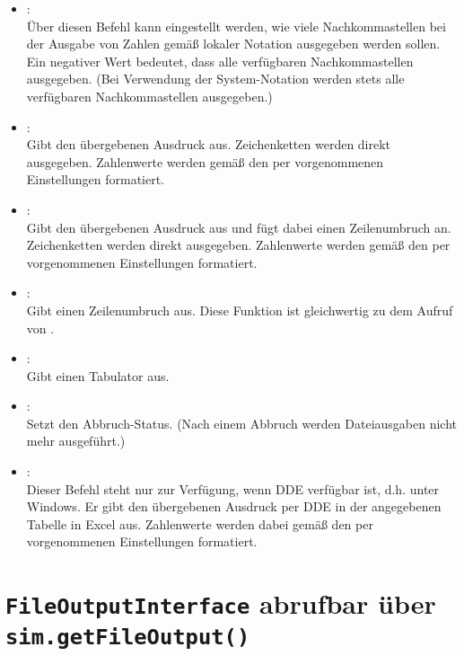 \begin{itemize}
\item
{}:\\
Über diesen Befehl kann eingestellt werden, wie viele Nachkommastellen bei der
Ausgabe von Zahlen gemäß lokaler Notation ausgegeben werden sollen. Ein
negativer Wert bedeutet, dass alle verfügbaren Nachkommastellen ausgegeben.
(Bei Verwendung der System-Notation werden stets alle verfügbaren Nachkommastellen ausgegeben.)

\item
{}:\\
Gibt den übergebenen Ausdruck aus.
Zeichenketten werden direkt ausgegeben. Zahlenwerte werden gemäß den per
 vorgenommenen Einstellungen formatiert.

\item
{}:\\
Gibt den übergebenen Ausdruck aus und fügt dabei einen Zeilenumbruch an.
Zeichenketten werden direkt ausgegeben. Zahlenwerte werden gemäß den per
 vorgenommenen Einstellungen formatiert.

\item
{}:\\
Gibt einen Zeilenumbruch aus. Diese Funktion ist gleichwertig zu dem Aufruf von
.

\item
{}:\\
Gibt einen Tabulator aus.

\item
{}:\\
Setzt den Abbruch-Status. (Nach einem Abbruch werden Dateiausgaben nicht mehr ausgeführt.)

\item
{}:\\
Dieser  Befehl steht nur zur Verfügung, wenn DDE verfügbar ist, d.h. unter Windows.
Er gibt den übergebenen Ausdruck per DDE in der angegebenen Tabelle in Excel aus.
Zahlenwerte werden dabei gemäß den per  vorgenommenen Einstellungen formatiert.

\end{itemize}



\chapter{\texttt{FileOutputInterface} abrufbar über \texttt{sim.getFileOutput()}}

